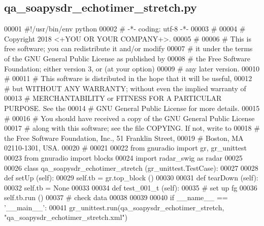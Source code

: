 \subsection{qa\+\_\+soapysdr\+\_\+echotimer\+\_\+stretch.\+py}
\label{qa__soapysdr__echotimer__stretch_8py_source}

\begin{DoxyCode}
00001 \textcolor{comment}{#!/usr/bin/env python}
00002 \textcolor{comment}{# -*- coding: utf-8 -*-}
00003 \textcolor{comment}{# }
00004 \textcolor{comment}{# Copyright 2018 <+YOU OR YOUR COMPANY+>.}
00005 \textcolor{comment}{# }
00006 \textcolor{comment}{# This is free software; you can redistribute it and/or modify}
00007 \textcolor{comment}{# it under the terms of the GNU General Public License as published by}
00008 \textcolor{comment}{# the Free Software Foundation; either version 3, or (at your option)}
00009 \textcolor{comment}{# any later version.}
00010 \textcolor{comment}{# }
00011 \textcolor{comment}{# This software is distributed in the hope that it will be useful,}
00012 \textcolor{comment}{# but WITHOUT ANY WARRANTY; without even the implied warranty of}
00013 \textcolor{comment}{# MERCHANTABILITY or FITNESS FOR A PARTICULAR PURPOSE.  See the}
00014 \textcolor{comment}{# GNU General Public License for more details.}
00015 \textcolor{comment}{# }
00016 \textcolor{comment}{# You should have received a copy of the GNU General Public License}
00017 \textcolor{comment}{# along with this software; see the file COPYING.  If not, write to}
00018 \textcolor{comment}{# the Free Software Foundation, Inc., 51 Franklin Street,}
00019 \textcolor{comment}{# Boston, MA 02110-1301, USA.}
00020 \textcolor{comment}{# }
00021 
00022 \textcolor{keyword}{from} gnuradio \textcolor{keyword}{import} gr, gr\_unittest
00023 \textcolor{keyword}{from} gnuradio \textcolor{keyword}{import} blocks
00024 \textcolor{keyword}{import} radar\_swig \textcolor{keyword}{as} radar
00025 
00026 \textcolor{keyword}{class }qa_soapysdr_echotimer_stretch (gr\_unittest.TestCase):
00027 
00028     \textcolor{keyword}{def }setUp (self):
00029         self.tb = gr.top\_block ()
00030 
00031     \textcolor{keyword}{def }tearDown (self):
00032         self.tb = \textcolor{keywordtype}{None}
00033 
00034     \textcolor{keyword}{def }test_001_t (self):
00035         \textcolor{comment}{# set up fg}
00036         self.tb.run ()
00037         \textcolor{comment}{# check data}
00038 
00039 
00040 \textcolor{keywordflow}{if} \_\_name\_\_ == \textcolor{stringliteral}{'\_\_main\_\_'}:
00041     gr\_unittest.run(qa\_soapysdr\_echotimer\_stretch, \textcolor{stringliteral}{"qa\_soapysdr\_echotimer\_stretch.xml"})
\end{DoxyCode}

